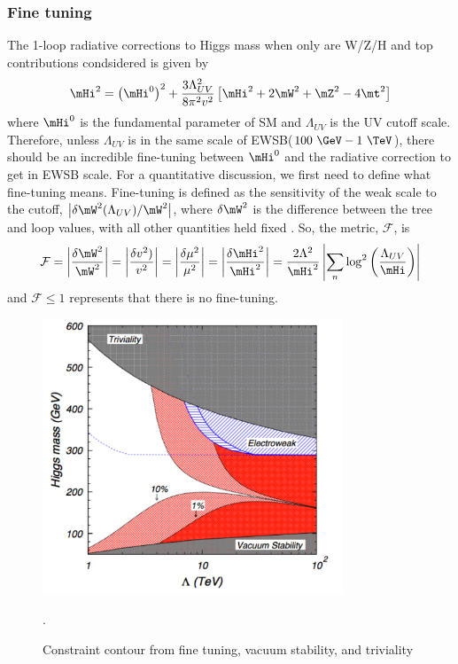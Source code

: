 \subsubsection{Fine tuning}
The 1-loop radiative corrections to Higgs mass when only are W/Z/H and top contributions 
condsidered is given by \cite{Djouadi20081}
\begin{eqnarray} 
\mHi^2 
= 
\left( \mHi^0 \right)^2 + \frac{3 \Lambda_{UV}^2}{8\pi^2v^2} 
\left[ \mHi^2 + 2\mW^2 + \mZ^2- 4 \mt^2 \right] 
\end{eqnarray} 
where $\mHi^0$ is the fundamental parameter of SM and $\Lambda_{UV}$ is the 
UV cutoff scale. Therefore, unless $\Lambda_{UV}$ is in the same scale of 
EWSB($100~\GeV - 1~\TeV$), there should be an incredible fine-tuning between 
$\mHi^0$ and the radiative correction to get \mHi{} in EWSB scale.  
For a quantitative discussion, we first need to define what fine-tuning means. 
Fine-tuning is defined as the sensitivity of the weak scale to
the cutoff, $\left| \delta \mW^2(\Lambda_{UV}) / \mW^2 \right|$, where $\delta \mW^2$ is the 
difference between the tree and loop values, with all other quantities held fixed \cite{Kolda:2000wi}.
So, the metric, $\mathcal{F}$, is  
\begin{eqnarray} 
\mathcal{F}
= \left| \frac{\delta \mW^2}{\mW^2} \right|
= \left| \frac{\delta v^2)}{v^2} \right|
= \left| \frac{\delta \mu^2}{\mu^2} \right|
= \left| \frac{\delta \mHi^2}{\mHi^2} \right|
= \frac{2\Lambda^2}{\mHi^2} \left| \sum_{n} 
  \log^2\left( \frac{\Lambda_{UV}}{\mHi} \right) \right| 
\end{eqnarray} 
and $\mathcal{F} \le 1$ represents that there is no fine-tuning. 
\begin{figure}[t]
\centering
\includegraphics[width=0.8\textwidth]{figures/finetuning.pdf}
\caption{Constraint contour from fine tuning, vacuum stability, and triviality}.
\label{fig:finetuning}
\end{figure}

